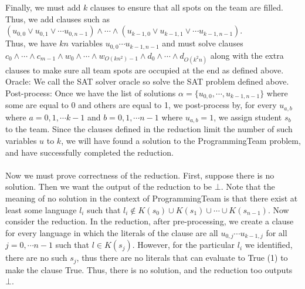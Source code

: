 \documentclass[11pt]{article}
\begin{document}
\begin{enumerate}
\begin{enumerate}
Finally, we must add $k$ clauses to ensure that all spots on the team are filled. Thus, we add clauses such as $(u_{0, 0} 
\vee u_{0, 1} \vee \cdots u_{0, n-1}) \wedge \cdots \wedge (u_{k-1, 0} \vee u_{k-1, 1} \vee \cdots u_{k-1, n-1})$. \\

Thus, we have $kn$ variables $u_{0, 0} \cdots u_{k-1, n-1}$ and must solve clauses $c_0 \wedge \cdots \wedge c_{m-1} \wedge w_0 \wedge \cdots \wedge w_{O(kn^2) - 1} \wedge d_0 \wedge \cdots \wedge d_{O(k^2n)}$ along with the extra clauses to make sure all team spots are occupied at the end as defined above. \\
Oracle: We call the SAT solver oracle so solve the SAT problem defined above. \\
Post-process: Once we have the list of solutions $\alpha = \{u_{0, 0}, \cdots, u_{k-1, n-1}\}$ where some are equal to 0 and others are equal to 1, we post-process by, for every $u_{a, b}$ where $a=0, 1, \cdots k-1$ and $b=0, 1, \cdots n-1$ where $u_{a, b} = 1$, we assign student $s_b$ to the team. Since the clauses defined in the reduction limit the number of such variables $u$ to $k$, we will have found a solution to the ProgrammingTeam problem, and have successfully completed the reduction. \\
\\ Now we must prove correctness of the reduction. First, suppose there is no solution. Then we want the output of the reduction to be $\bot$. Note that the meaning of no solution in the context of ProgrammingTeam is that there exist at least some language $l_i$ such that $l_i \notin K(s_0) \cup K(s_1) \cup \cdots \cup K(s_{n-1})$. Now consider the reduction. In the reduction, after pre-processing, we create a clause for every language in which the literals of the clause are all $u_{0, j} \cdots u_{k-1, j}$ for all $j=0, \cdots n-1$ such that $l \in K(s_j)$. However, for the particular $l_i$ we identified, there are no such $s_j$, thus there are no literals that can evaluate to True (1) to make the clause True. Thus, there is no solution, and the reduction too outputs $\bot$. \\


\end{enumerate}
\end{enumerate}
\end{document}
